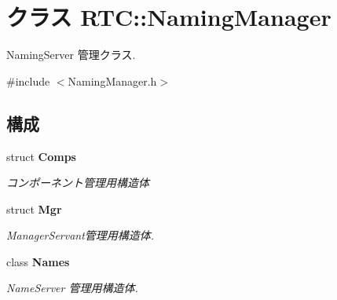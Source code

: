 \section{クラス RTC::NamingManager}
\label{classRTC_1_1NamingManager}


NamingServer 管理クラス.  




{\ttfamily \#include $<$NamingManager.h$>$}

\subsection*{構成}
\begin{DoxyCompactItemize}
\item 
struct {\bf Comps}
\begin{DoxyCompactList}\small\item\em コンポーネント管理用構造体 \item\end{DoxyCompactList}\item 
struct {\bf Mgr}
\begin{DoxyCompactList}\small\item\em ManagerServant管理用構造体. \item\end{DoxyCompactList}\item 
class {\bf Names}
\begin{DoxyCompactList}\small\item\em NameServer 管理用構造体. \item\end{DoxyCompactList}\end{DoxyCompactItemize}

